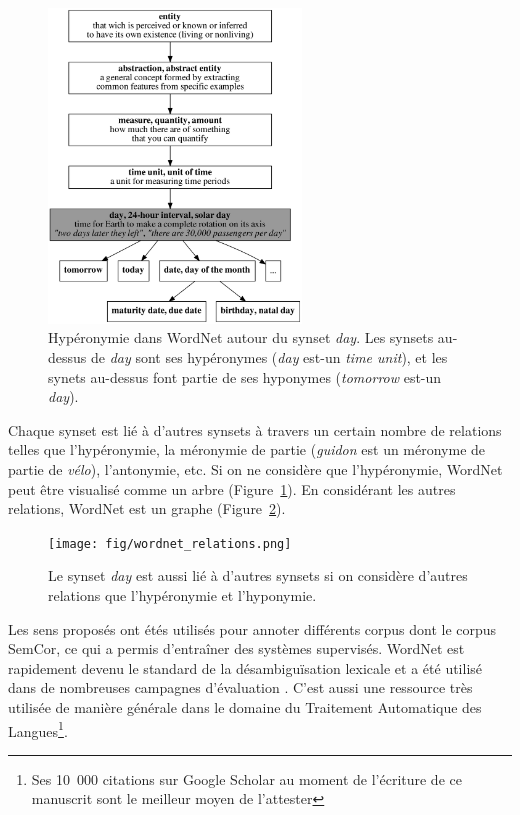 \begin{figure}[t]
    \centering
    \includegraphics[width=0.6\textwidth]{fig/wordnet_hypernymy.png}
    \caption{\label{fig:wordnet_hypernymy}Hypéronymie dans WordNet autour du
        synset \emph{day}. Les synsets au-dessus de \emph{day} sont ses hypéronymes
        (\emph{day} est-un \emph{time unit}), et les synets au-dessus font partie de
        ses hyponymes (\emph{tomorrow} est-un \emph{day}).}
\end{figure}

Chaque synset est lié à d'autres synsets à travers un certain nombre de
relations telles que l'hypéronymie, la méronymie de partie (\emph{guidon} est
un méronyme de partie de \emph{vélo}), l'antonymie, etc. Si on ne considère que
l'hypéronymie, WordNet peut être visualisé comme un arbre
(Figure~\ref{fig:wordnet_hypernymy}). En considérant les autres relations,
WordNet est un graphe (Figure~\ref{fig:wordnet_relations}).

\begin{figure}[t]
    \centering
    \texttt{[image: fig/wordnet\_relations.png]}
    \caption{\label{fig:wordnet_relations} Le synset \emph{day} est aussi lié à
        d'autres synsets si on considère d'autres relations que l'hypéronymie et
        l'hyponymie.}
\end{figure}

Les sens proposés ont étés utilisés pour annoter différents corpus dont le
corpus SemCor, ce qui a permis d'entraîner des systèmes supervisés. WordNet est
rapidement devenu le standard de la désambiguïsation lexicale et a été utilisé
dans de nombreuses campagnes d'évaluation \citep{navigli2009word}. C'est aussi
une ressource très utilisée de manière générale dans le domaine du Traitement
Automatique des Langues\footnote{Ses 10~000 citations sur Google Scholar au
moment de l'écriture de ce manuscrit sont le meilleur moyen de l'attester}.

